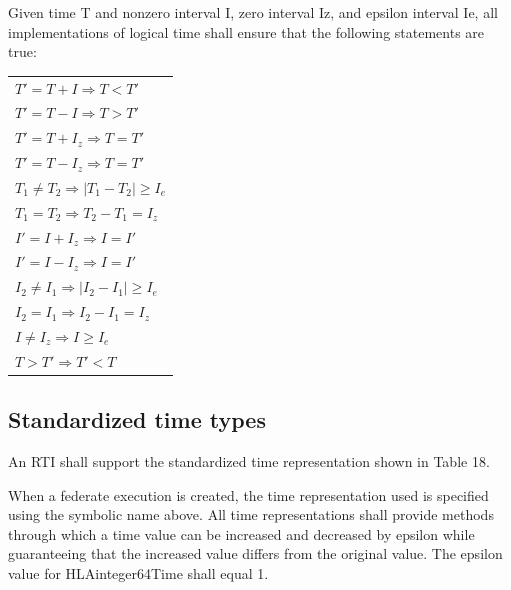 \begin{compactstdpage}
    Given time T and nonzero interval I, zero interval Iz, and epsilon interval Ie, all implementations of logical time shall ensure that the following statements are true:

    \begin{flushleft}
        \hspace*{1.2em}\begin{tabular}{@{}l@{}}
                           $T' = T + I \Rightarrow T < T'$               \\
                           $T' = T - I \Rightarrow T > T'$               \\
                           $T' = T + I_z \Rightarrow T = T'$             \\
                           $T' = T - I_z \Rightarrow T = T'$             \\
                           $T_1 \ne T_2 \Rightarrow |T_1 - T_2| \ge I_e$ \\
                           $T_1 = T_2 \Rightarrow T_2 - T_1 = I_z$       \\
                           $I' = I + I_z \Rightarrow I = I'$             \\
                           $I' = I - I_z \Rightarrow I = I'$             \\
                           $I_2 \ne I_1 \Rightarrow |I_2 - I_1| \ge I_e$ \\
                           $I_2 = I_1 \Rightarrow I_2 - I_1 = I_z$       \\
                           $I \ne I_z \Rightarrow I \ge I_e$             \\
                           $T > T' \Rightarrow T' < T$                   \\
        \end{tabular}
    \end{flushleft}

    \subsection{Standardized time types}

    An RTI shall support the standardized time representation shown in Table 18.

    \cxiitableeighteen

    When a federate execution is created, the time representation used is specified using the symbolic name above. All time representations shall provide methods through which a time value can be increased and decreased by epsilon while guaranteeing that the increased value differs from the original value. The epsilon value for HLAinteger64Time shall equal 1.


\end{compactstdpage}
